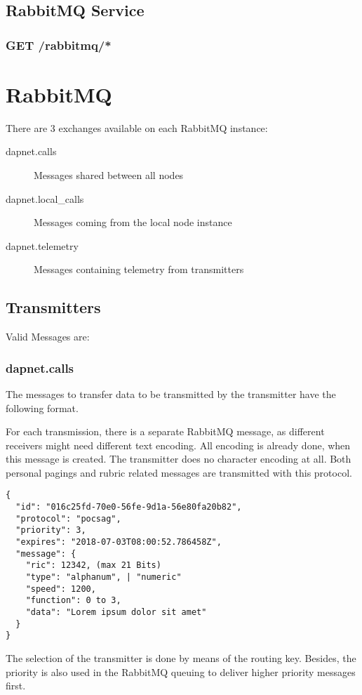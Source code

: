 
\subsection{RabbitMQ Service}

\subsubsection{GET /rabbitmq/*}


\section{RabbitMQ}
\label{protocoldef:RabbitMQ}
There are 3 exchanges available on each RabbitMQ instance:
\begin{description}
\item[dapnet.calls] Messages shared between all nodes
\item[dapnet.local\_calls] Messages coming from the local node instance
\item[dapnet.telemetry] Messages containing telemetry from transmitters
\end{description}


\subsection{Transmitters}
\label{protocoldef:RabbitMQ:Transmitters}

Valid Messages are:

\subsubsection{dapnet.calls}
\label{protocoldef:RabbitMQ:dapnet.calls}
The messages to transfer data to be transmitted by the transmitter have the
following format.

For each transmission, there is a separate RabbitMQ message, as different
receivers might need different text encoding. All encoding is already done, when
this message is created. The transmitter does no character encoding at all. Both
personal pagings and rubric related messages are transmitted with this protocol.

\begin{lstlisting}
{
  "id": "016c25fd-70e0-56fe-9d1a-56e80fa20b82",
  "protocol": "pocsag",
  "priority": 3,
  "expires": "2018-07-03T08:00:52.786458Z",
  "message": {
    "ric": 12342, (max 21 Bits)
    "type": "alphanum", | "numeric"
    "speed": 1200,
    "function": 0 to 3,
    "data": "Lorem ipsum dolor sit amet"
  }
}
\end{lstlisting}
The selection of the transmitter is done by means of the routing key. Besides,
the priority is also used in the RabbitMQ queuing to deliver higher priority
messages first.

